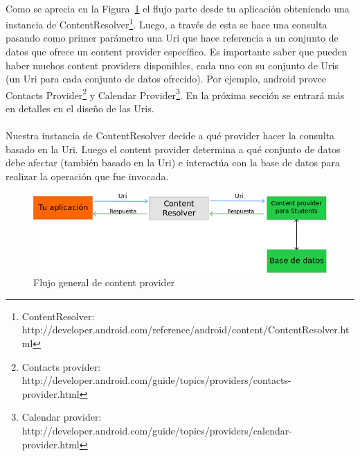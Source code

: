 \documentclass[10pt]{extarticle}
\begin{document}
\paragraph{}
Como se aprecia en la Figura~\ref{fig:flujo_content_provider} el flujo parte desde tu aplicación obteniendo una instancia de ContentResolver\footnote{ContentResolver: http://developer.android.com/reference/android/content/ContentResolver.html}. Luego, a través de esta se hace una consulta pasando como primer parámetro una Uri que hace referencia a un conjunto de datos que ofrece un content provider específico. Es importante saber que pueden haber muchos content providers disponibles, cada uno con su conjunto de Uris (un Uri para cada conjunto de datos ofrecido). Por ejemplo, android provee Contacts Provider\footnote{Contacts provider: http://developer.android.com/guide/topics/providers/contacts-provider.html} y Calendar Provider\footnote{Calendar provider: http://developer.android.com/guide/topics/providers/calendar-provider.html}. En la próxima sección se entrará más en detalles en el diseño de las Uris.

\paragraph{}
Nuestra instancia de ContentResolver decide a qué provider hacer la consulta basado en la Uri. Luego el content provider determina a qué conjunto de datos debe afectar (también basado en la Uri) e interactúa con la base de datos para realizar la operación que fue invocada.
\begin{figure}[H]
    \centering
    \includegraphics[width=1\textwidth]{ContentProviderGeneral.png}
    \caption{Flujo general de content provider}
    \label{fig:flujo_content_provider}
\end{figure}
\end{document}
